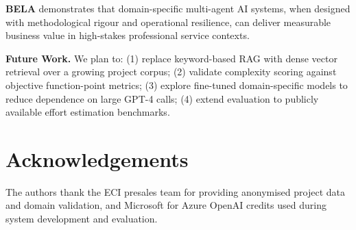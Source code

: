 \documentclass[10pt,twocolumn]{article}
\newcommand{\bela}{\textbf{BELA}}
\begin{document}
\bela{} demonstrates that domain-specific multi-agent AI systems, when designed
with methodological rigour and operational resilience, can deliver measurable
business value in high-stakes professional service contexts.

\medskip\noindent\textbf{Future Work.} We plan to:
(1) replace keyword-based RAG with dense vector retrieval over a growing project corpus;
(2) validate complexity scoring against objective function-point metrics;
(3) explore fine-tuned domain-specific models to reduce dependence on large GPT-4 calls;
(4) extend evaluation to publicly available effort estimation benchmarks.

\section*{Acknowledgements}

The authors thank the ECI presales team for providing anonymised project data
and domain validation, and Microsoft for Azure OpenAI credits used during
system development and evaluation.
\end{document}
